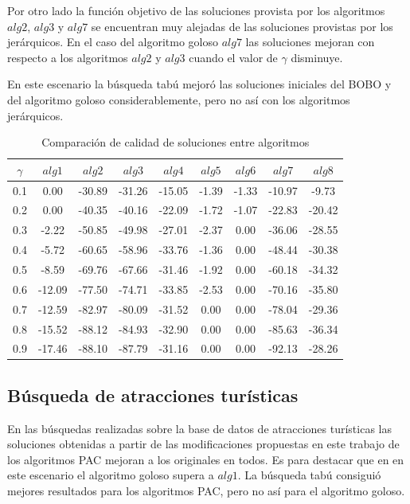 Por otro lado la función objetivo de las soluciones provista por los algoritmos $alg2$, $alg3$ y $alg7$ se encuentran muy alejadas de las soluciones provistas por los jerárquicos. En el caso del algoritmo goloso $alg7$ las soluciones mejoran con respecto a los algoritmos $alg2$ y $alg3$ cuando el valor de $\gamma$ disminuye.

En este escenario la búsqueda tabú mejoró las soluciones iniciales del BOBO y del algoritmo goloso considerablemente, pero no así con los algoritmos jerárquicos. 
\begin{table}[H]
\begin{center}
\begin{tabular}{|c|c|c|c|c|c|c|c|c|}
\hline
$\gamma$&$alg1$&$alg2$&$alg3$&$alg4$&$alg5$&$alg6$&$alg7$&$alg8$ \\ \hline
0.1 & 0.00 & -30.89 & -31.26 & -15.05 & -1.39 & -1.33 & -10.97 & -9.73 \\
0.2 & 0.00 & -40.35 & -40.16 & -22.09 & -1.72 & -1.07 & -22.83 & -20.42 \\
0.3 & -2.22 & -50.85 & -49.98 & -27.01 & -2.37 & 0.00 & -36.06 & -28.55 \\
0.4 & -5.72 & -60.65 & -58.96 & -33.76 & -1.36 & 0.00 & -48.44 & -30.38 \\
0.5 & -8.59 & -69.76 & -67.66 & -31.46 & -1.92 & 0.00 & -60.18 & -34.32 \\
0.6 & -12.09 & -77.50 & -74.71 & -33.85 & -2.53 & 0.00 & -70.16 & -35.80 \\
0.7 & -12.59 & -82.97 & -80.09 & -31.52 & 0.00 & 0.00 & -78.04 & -29.36 \\
0.8 & -15.52 & -88.12 & -84.93 & -32.90 & 0.00 & 0.00 & -85.63 & -36.34 \\
0.9 & -17.46 & -88.10 & -87.79 & -31.16 & 0.00 & 0.00 & -92.13 & -28.26 \\
 \hline 
\end{tabular}
\caption{Comparación de calidad de soluciones entre algoritmos} 
\label{tabla:comp3}
\end{center}
\end{table}

\subsection{Búsqueda de atracciones turísticas}\label{res:busAtracciones}
En las búsquedas realizadas sobre la base de datos de atracciones turísticas las soluciones obtenidas a partir de las modificaciones propuestas en este trabajo de los algoritmos PAC mejoran a los originales en todos. Es para destacar que en en este escenario el algoritmo goloso supera a $alg1$. La búsqueda tabú consiguió mejores resultados para los algoritmos PAC, pero no así para el algoritmo goloso.

